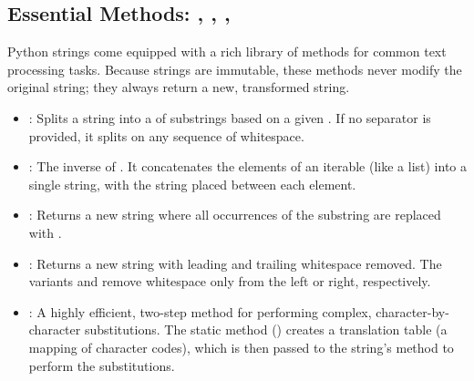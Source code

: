\subsection{Essential Methods: , , , }
\label{subsec:string_methods}
Python strings come equipped with a rich library of methods for common text processing tasks. Because strings are immutable, these methods never modify the original string; they always return a new, transformed string.

\begin{itemize}
    \item \textbf{}: Splits a string into a  of substrings based on a given . If no separator is provided, it splits on any sequence of whitespace.
    
    \item \textbf{}: The inverse of . It concatenates the elements of an iterable (like a list) into a single string, with the  string placed between each element.
    
    \item \textbf{}: Returns a new string where all occurrences of the substring  are replaced with .
    
    \item \textbf{}: Returns a new string with leading and trailing whitespace removed. The variants  and  remove whitespace only from the left or right, respectively.

    \item \textbf{}: A highly efficient, two-step method for performing complex, character-by-character substitutions. The static method ()  creates a translation table (a mapping of character codes), which is then passed to the string's  method to perform the substitutions.
\end{itemize}

